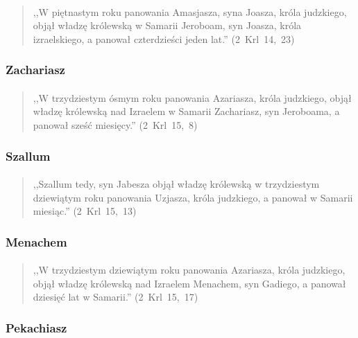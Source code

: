 \documentclass[10pt,a4paper,oneside]{article}
\begin{document}
\paragraph{}
\begin{quote}
,,W piętnastym roku panowania Amasjasza, syna Joasza, króla judzkiego, objął władzę królewską w Samarii Jeroboam, syn Joasza, króla izraelskiego, a panował czterdzieści jeden lat.'' \mbox{(2 Krl 14, 23)}
\end{quote}
\subsubsection{Zachariasz}
\paragraph{}
\begin{quote}
,,W trzydziestym ósmym roku panowania Azariasza, króla judzkiego, objął władzę królewską nad Izraelem w Samarii Zachariasz, syn Jeroboama, a panował sześć miesięcy.'' \mbox{(2 Krl 15, 8)}
\end{quote}
\subsubsection{Szallum}
\paragraph{}
\begin{quote}
,,Szallum tedy, syn Jabesza objął władzę królewską w trzydziestym dziewiątym roku panowania Uzjasza, króla judzkiego, a panował w Samarii miesiąc.'' \mbox{(2 Krl 15, 13)}
\end{quote}
\subsubsection{Menachem}
\paragraph{}
\begin{quote}
,,W trzydziestym dziewiątym roku panowania Azariasza, króla judzkiego, objął władzę królewską nad Izraelem Menachem, syn Gadiego, a panował dziesięć lat w Samarii.'' \mbox{(2 Krl 15, 17)}
\end{quote}
\subsubsection{Pekachiasz}
\end{document}

